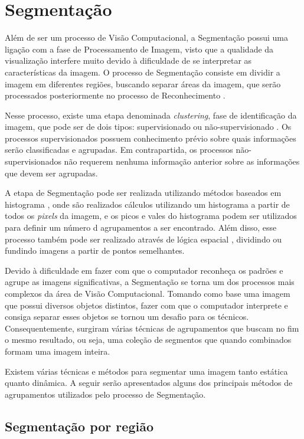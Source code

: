 \section{Segmentação}

Além de ser um processo de Visão Computacional, a Segmentação possui uma ligação com a fase de Processamento de Imagem, visto que a qualidade da visualização interfere muito devido à dificuldade de se interpretar as características da imagem. O processo de Segmentação consiste em dividir a imagem em diferentes regiões, buscando separar áreas da imagem, que serão processados posteriormente no processo de Reconhecimento \cite{PUZICHA}.

Nesse processo, existe uma etapa denominada \textit{clustering}, fase de identificação da imagem, que pode ser de dois tipos: supervisionado ou não-supervisionado \cite{ZHOU}. Os processos supervisionados possuem conhecimento prévio sobre quais informações serão classificadas e agrupadas. Em contrapartida, os processos não-supervisionados não requerem nenhuma informação anterior sobre as informações que devem ser agrupadas.

A etapa de Segmentação pode ser realizada utilizando métodos baseados em histograma \cite{ROTHER}, onde são realizados cálculos utilizando um histograma a partir de todos os \textit{pixels} da imagem, e os picos e vales do histograma podem ser utilizados para definir um número d agrupamentos a ser encontrado. Além disso, esse processo também pode ser realizado através de lógica espacial \cite{KOLMOGOROV}, dividindo ou fundindo imagens a partir de pontos semelhantes.

Devido à dificuldade em fazer com que o computador reconheça os padrões e agrupe as imagens significativas, a Segmentação se torna um dos processos mais complexos da área de Visão Computacional. Tomando como base uma imagem que possui diversos objetos distintos, fazer com que o computador interprete e consiga separar esses objetos se tornou um desafio para os técnicos. Consequentemente, surgiram várias técnicas de agrupamentos que buscam no fim o mesmo resultado, ou seja, uma coleção de segmentos que quando combinados formam uma imagem inteira.

Existem várias técnicas e métodos para segmentar uma imagem tanto estática quanto dinâmica. A seguir serão apresentados alguns dos principais métodos de agrupamentos utilizados pelo processo de Segmentação.

\subsection{Segmentação por região}

